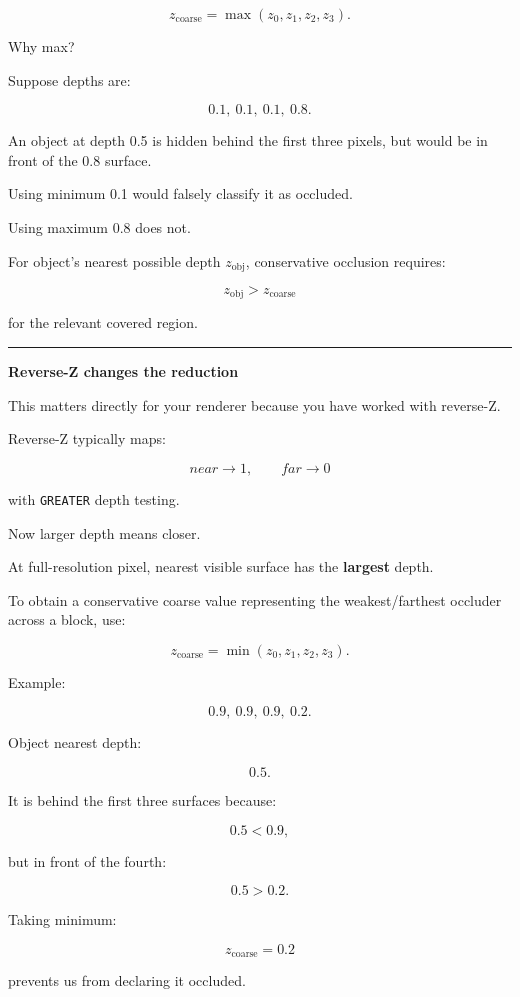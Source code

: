 \[
\boxed{
z_{\text{coarse}}
=
\max(z_0,z_1,z_2,z_3).
}
\]

Why max?

Suppose depths are:

\[
0.1,\ 0.1,\ 0.1,\ 0.8.
\]

An object at depth 0.5 is hidden behind the first three pixels, but would be in front of the 0.8 surface.

Using minimum 0.1 would falsely classify it as occluded.

Using maximum 0.8 does not.

For object's nearest possible depth \(z_{\text{obj}}\), conservative occlusion requires:

\[
\boxed{
z_{\text{obj}}>z_{\text{coarse}}
}
\]

for the relevant covered region.

\begin{center}\rule{0.5\linewidth}{0.5pt}\end{center}

\textbf{Reverse-Z changes the reduction}

This matters directly for your renderer because you have worked with reverse-Z.

Reverse-Z typically maps:

\[
near\rightarrow1,
\qquad
far\rightarrow0
\]

with \texttt{GREATER} depth testing.

Now larger depth means closer.

At full-resolution pixel, nearest visible surface has the \textbf{largest} depth.

To obtain a conservative coarse value representing the weakest/farthest occluder across a block, use:

\[
\boxed{
z_{\text{coarse}}
=
\min(z_0,z_1,z_2,z_3).
}
\]

Example:

\[
0.9,\ 0.9,\ 0.9,\ 0.2.
\]

Object nearest depth:

\[
0.5.
\]

It is behind the first three surfaces because:

\[
0.5<0.9,
\]

but in front of the fourth:

\[
0.5>0.2.
\]

Taking minimum:

\[
z_{\text{coarse}}=0.2
\]

prevents us from declaring it occluded.

